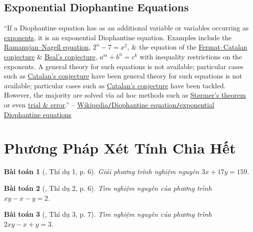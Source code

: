 \documentclass{article}
\numberwithin{equation}{section}
\newtheorem{baitoan}{Bài toán}[section]
\begin{document}
\subsection{Exponential Diophantine Equations}
``If a Diophantine equation has as an additional variable or variables occurring as \href{https://en.wikipedia.org/wiki/Exponentiation}{exponents}, it is an exponential Diophantine equation. Examples include the \href{https://en.wikipedia.org/wiki/Ramanujan%E2%80%93Nagell_equation}{Ramanujan--Nagell equation}, $2^n - 7 = x^2$, \& the equation of the \href{https://en.wikipedia.org/wiki/Fermat%E2%80%93Catalan_conjecture}{Fermat--Catalan conjecture} \& \href{https://en.wikipedia.org/wiki/Beal%27s_conjecture}{Beal's conjecture}, $a^m + b^n = c^k$ with inequality restrictions on the exponents. A general theory for such equations is not available; particular cases such as \href{https://en.wikipedia.org/wiki/Catalan%27s_conjecture}{Catalan's conjecture} have been general theory for such equations is not available; particular cases such as \href{https://en.wikipedia.org/wiki/Catalan%27s_conjecture}{Catalan's conjecture} have been tackled. However, the majority are solved via ad hoc methods such as \href{https://en.wikipedia.org/wiki/St%C3%B8rmer%27s_theorem}{St\o rmer's theorem} or even \href{https://en.wikipedia.org/wiki/Trial_and_error}{trial \& error}.'' -- \href{https://en.wikipedia.org/wiki/Diophantine_equation#Exponential_Diophantine_equations}{Wikipedia\texttt{/}Diophantine equation\texttt{/}exponential Diophantine equations}


\section{Phương Pháp Xét Tính Chia Hết}

\begin{baitoan}[\cite{Binh_PTNN}, Thí dụ 1, p. 6]
	Giải phương trình nghiệm nguyên $3x + 17y = 159$.
\end{baitoan}

\begin{baitoan}[\cite{Binh_PTNN}, Thí dụ 2, p. 6]
	Tìm nghiệm nguyên của phương trình $xy - x - y = 2$.
\end{baitoan}

\begin{baitoan}[\cite{Binh_PTNN}, Thí dụ 3, p. 7]
	Tìm nghiệm nguyên của phương trình $2xy - x + y = 3$.
\end{baitoan}


\printbibliography[heading=bibintoc]
	
\end{document}
